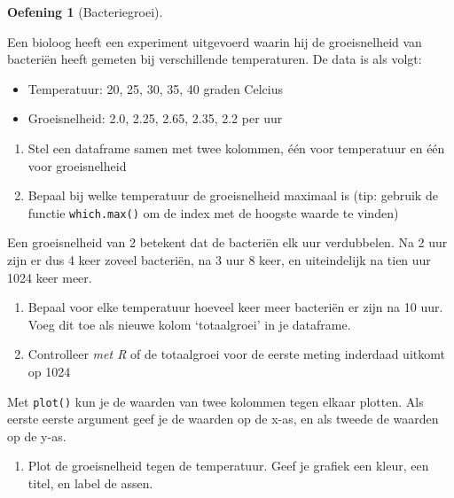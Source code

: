 \documentclass[
  a4paper,
]{scrbook}
\providecommand{\tightlist}{%
  \setlength{\itemsep}{0pt}\setlength{\parskip}{0pt}}\usepackage{longtable,booktabs,array}
\theoremstyle{definition}
\newtheorem{exercise}{Oefening}[chapter]
\theoremstyle{remark}
\begin{document}
\begin{exercise}[Bacteriegroei]\protect\hypertarget{exr-bacterienR}{}\label{exr-bacterienR}

Een bioloog heeft een experiment uitgevoerd waarin hij de groeisnelheid
van bacteriën heeft gemeten bij verschillende temperaturen. De data is
als volgt:

\begin{itemize}
\tightlist
\item
  Temperatuur: 20, 25, 30, 35, 40 graden Celcius
\item
  Groeisnelheid: 2.0, 2.25, 2.65, 2.35, 2.2 per uur
\end{itemize}

\begin{enumerate}
\def\labelenumi{\alph{enumi}.}
\tightlist
\item
  Stel een dataframe samen met twee kolommen, één voor temperatuur en
  één voor groeisnelheid
\item
  Bepaal bij welke temperatuur de groeisnelheid maximaal is (tip:
  gebruik de functie \texttt{which.max()} om de index met de hoogste
  waarde te vinden)
\end{enumerate}

Een groeisnelheid van 2 betekent dat de bacteriën elk uur verdubbelen.
Na 2 uur zijn er dus 4 keer zoveel bacteriën, na 3 uur 8 keer, en
uiteindelijk na tien uur 1024 keer meer.

\begin{enumerate}
\def\labelenumi{\alph{enumi}.}
\setcounter{enumi}{2}
\tightlist
\item
  Bepaal voor elke temperatuur hoeveel keer meer bacteriën er zijn na 10
  uur. Voeg dit toe als nieuwe kolom `totaalgroei' in je dataframe.
\item
  Controlleer \emph{met R} of de totaalgroei voor de eerste meting
  inderdaad uitkomt op 1024
\end{enumerate}

Met \texttt{plot()} kun je de waarden van twee kolommen tegen elkaar
plotten. Als eerste eerste argument geef je de waarden op de x-as, en
als tweede de waarden op de y-as.

\begin{enumerate}
\def\labelenumi{\alph{enumi}.}
\setcounter{enumi}{4}
\tightlist
\item
  Plot de groeisnelheid tegen de temperatuur. Geef je grafiek een kleur,
  een titel, en label de assen.
\end{enumerate}

\end{exercise}
\end{document}
